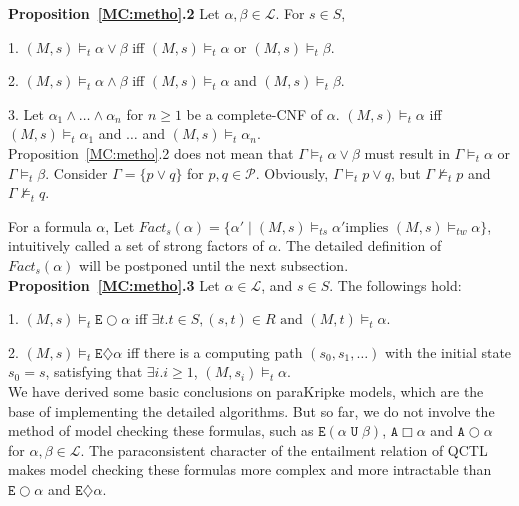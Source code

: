 \documentclass{entcs}
\begin{document}
\noindent\textbf{Proposition~\ref{MC:metho}.2} Let
$\alpha,\beta\in\mathcal{L}$. For $s\in S $,

1. $(M,s)\models_t\alpha\vee\beta$ iff $(M,s)\models_t\alpha$ or
$(M,s)\models_t\beta$.

2. $(M,s)\models_t\alpha\wedge\beta$ iff $(M,s)\models_t\alpha$
and $(M,s)\models_t\beta$.

3. Let
$\alpha_1\wedge\ldots\wedge\alpha_n$ for $n\geq 1$ be a
complete-CNF
 of $\alpha$. $(M,s)\models_t\alpha$ iff
$(M,s)\models_t\alpha_1$ and $\ldots$ and
$(M,s)\models_t\alpha_n$.\\

Proposition~\ref{MC:metho}.2 does not mean that
$\Gamma\models_t\alpha\vee\beta$ must result in
$\Gamma\models_t\alpha$ or $\Gamma\models_t\beta$. Consider
$\Gamma=\{p\vee q\}$ for $p,q\in\mathcal{P}$. Obviously,
$\Gamma\models_t p\vee q$, but $\Gamma\not\models_t p$ and
$\Gamma\not\models_t q$.

For a formula $\alpha$, Let
$Fact_s(\alpha)=\{\alpha'\;|\;(M,s)\models_{ts}\alpha'\mbox{
implies }(M,s)\models_{tw}\alpha\}$,
 intuitively called a set of
strong factors of $\alpha$. The detailed definition of
$Fact_s(\alpha)$ will be postponed until the next subsection.\\

\noindent\textbf{Proposition~\ref{MC:metho}.3} Let
$\alpha\in\mathcal{L}$, and $s\in S$. The followings hold:

1. $(M,s)\models_t\texttt{E}\bigcirc\alpha$ iff $\exists t.t\in S,
(s,t)\in R\mbox{ and }(M,t)\models_t\alpha$.

2. $(M,s)\models_t\texttt{E}\diamondsuit\alpha$ iff there is a
computing path $(s_0,s_1,\dots)$ with the initial state $s_0=s$,
satisfying that $\exists i.i\geq 1$, $(M,s_i)\models_t\alpha$.\\

We have derived some basic conclusions on paraKripke models, which
are the base of implementing the detailed algorithms. But so far,
we do not involve the method of model checking these formulas,
such as $\texttt{E}(\alpha\;\texttt{U}\;\beta)$,
$\texttt{A}\Box\alpha$ and $\texttt{A}\bigcirc\alpha$ for
$\alpha,\beta\in\mathcal{L}$. The paraconsistent character of the
entailment relation of QCTL makes model checking these formulas
more complex and more intractable than $\texttt{E}\bigcirc\alpha$
and $\texttt{E}\diamondsuit\alpha$.
\end{document}
